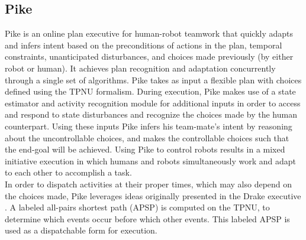 \subsection*{Pike}
\label{intro: Pike}

Pike \cite{levine2018watching} is an online plan executive for human-robot teamwork that quickly adapts and infers intent based on the preconditions of actions in the plan, temporal constraints, unanticipated disturbances, and choices made previously (by either robot or human). It achieves plan recognition and adaptation concurrently through a single set of algorithms.
Pike takes as input a flexible plan with choices defined using the TPNU formalism. During execution, Pike makes use of a state estimator and activity recognition module for additional inputs in order to access and respond to state disturbances and recognize
the choices made by the human counterpart. Using these inputs Pike infers his team-mate's intent by reasoning about the uncontrollable choices, and makes the controllable choices such that the end-goal will be achieved.
Using Pike to control robots results in a mixed initiative execution in which humans and robots simultaneously work and adapt to each other to accomplish a task.\\
In order to dispatch activities at their proper times, which
may also depend on the choices made, Pike leverages ideas
originally presented in the Drake executive \cite{conrad2010flexible}.
A labeled all-pairs shortest path (APSP) is computed on
the TPNU, to determine which events occur before which
other events. This labeled APSP is used as a dispatchable form for execution.
